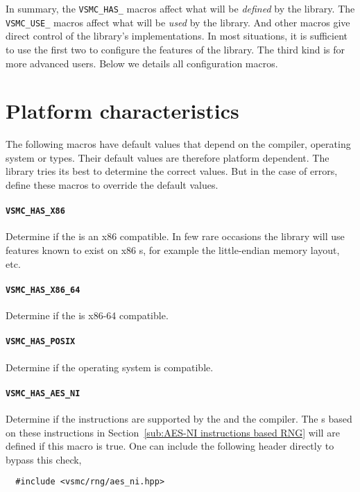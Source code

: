 In summary, the \verb|VSMC_HAS_| macros affect what will be \emph{defined} by
the library. The \verb|VSMC_USE_| macros affect what will be \emph{used} by the
library. And other macros give direct control of the library's implementations.
In most situations, it is sufficient to use the first two to configure the
features of the library. The third kind is for more advanced users. Below we
details all configuration macros.

\section{Platform characteristics}
\label{sec:Platform characteristics}

The following macros have default values that depend on the compiler, operating
system or \cpu types. Their default values are therefore platform dependent.
The library tries its best to determine the correct values. But in the case of
errors, define these macros to override the default values.

\paragraph{\texttt{VSMC\_HAS\_X86}} Determine if the \cpu is an x86 compatible.
In few rare occasions the library will use features known to exist on x86
\cpu{}s, for example the little-endian memory layout, etc.

\paragraph{\texttt{VSMC\_HAS\_X86\_64}} Determine if the \cpu is x86-64
compatible.

\paragraph{\texttt{VSMC\_HAS\_POSIX}} Determine if the operating system is
\posix compatible.

\paragraph{\texttt{VSMC\_HAS\_AES\_NI}} Determine if the \aesni instructions
are supported by the \cpu and the compiler. The \rng{}s based on these
instructions in Section~\ref{sub:AES-NI instructions based RNG} will are
defined if this macro is true. One can include the following header directly to
bypass this check,
\begin{Verbatim}
  #include <vsmc/rng/aes_ni.hpp>
\end{Verbatim}

